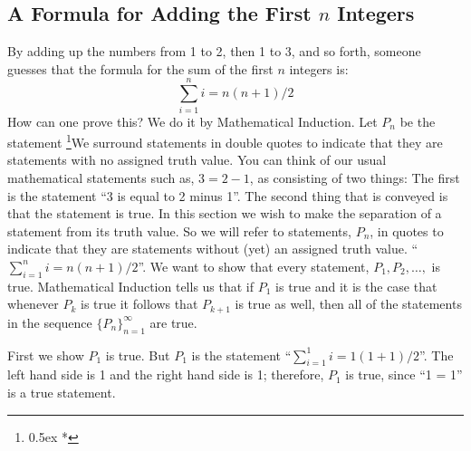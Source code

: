 \subsection{A Formula for Adding the First $n$ Integers}
By adding up the numbers from 1 to 2, then 1 to 3, and so forth, someone guesses 
that the formula for the sum of the first $n$ integers is:
$$
\sum_{i=1}^n i = n(n+1)/2
$$
How can one prove this? We do it by Mathematical Induction. Let $P_n$ be the statement%
\footnote{\kern 0.5pt \raise 0.5ex \hbox{*}}{We surround statements in double quotes to indicate that they are 
statements with no assigned truth value. You can think of our usual mathematical statements such as, $3 = 2 - 1$, as consisting
of two things: The first is the statement ``3 is equal to 2 minus 1''. The second thing that is conveyed is that the 
statement is true. In this section we wish to make the separation of a statement from its truth value. So we will refer to 
statements, $P_n$, in quotes to indicate that they are statements without (yet) an assigned truth value.}
``$\sum_{i=1}^n i = n(n+1)/2$''. We want to show that every statement, $P_1, P_2, \ldots, $ is true. 
Mathematical Induction tells us that if $P_1$ is true 
and it is the case that whenever $P_k$ is true it follows that $P_{k+1}$ is 
true as well, then all of the statements in the sequence $\{P_n\}_{n=1}^\infty$ 
are true.

First we show $P_1$ is true. But $P_1$ is the statement 
``$\sum_{i=1}^1 i = 1(1+1)/2$''. The left hand side is 1 and the right hand side 
is 1; therefore, $P_1$ is true, since ``1 = 1'' is a true statement.

